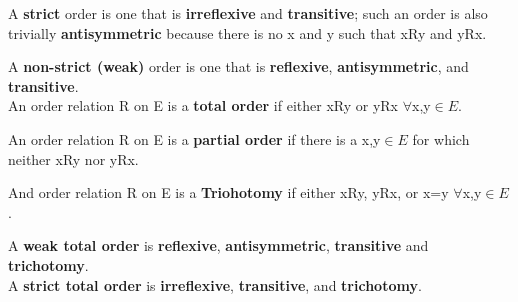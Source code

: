 A  \textbf{strict} order is one that is \textbf{irreflexive} and  \textbf{transitive}; such an order is also trivially  \textbf{antisymmetric} because there is no x and y such that xRy and yRx. 

A \textbf{non-strict (weak)} order is one that is \textbf{reflexive}, \textbf{antisymmetric}, and \textbf{transitive}. \\

An order relation R on E is a \textbf{total order} if either xRy or yRx $\forall$x,y$\in{E}$. 

An order relation R on E is a \textbf{partial order} if there is a  x,y$\in{E}$ for which neither xRy nor yRx. 

And order relation R on E is a \textbf{Triohotomy} if either xRy, yRx, or x=y $\forall$x,y$\in{E}$.

A \textbf{weak total order} is \textbf{reflexive}, \textbf{antisymmetric}, \textbf{transitive} and \textbf{trichotomy}. \\
A \textbf{strict total order} is \textbf{irreflexive}, \textbf{transitive}, and \textbf{trichotomy}.

